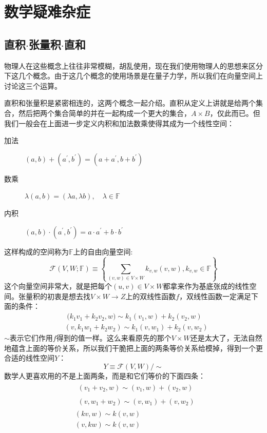 \chapter{数学疑难杂症}
\section{直积$\cdot$张量积$\cdot$直和}
物理人在这些概念上往往非常模糊，胡乱使用，现在我们使用物理人的思想来区分下这几个概念。由于这几个概念的使用场景是在量子力学，所以我们在向量空间上讨论这三个运算。

直积和张量积是紧密相连的，这两个概念一起介绍。直积从定义上讲就是给两个集合，然后把两个集合简单的并在一起构成一个更大的集合，$A\times B$，仅此而已。但我们一般会在上面进一步定义内积和加法数乘使得其成为一个线性空间：
\begin{description}
	\item[加法] $(a,b)+(a^\prime,b^\prime)=(a+a^\prime,b+b^\prime)$
	\item[数乘] $\lambda (a,b)=(\lambda a,\lambda b),\quad\lambda\in\mathbb{F}$
	\item[内积] $(a,b)\cdot (a^\prime,b^\prime)= a\cdot a^\prime +b\cdot b^\prime$
\end{description}
这样构成的空间称为$\mathbb{F}$上的自由向量空间:
\begin{equation}
	\mathcal{F}(V,W;\mathbb{F})\equiv \left\{\sum_{(v,w)\in V\times W}k_{v,w}(v,w),k_{v,w}\in\mathbb{F}\right\}
\end{equation}
这个向量空间非常大，就是把每个$(u,v)\in V\times W$都拿来作为基底张成的线性空间。张量积的初衷是想去找$V\times W\to Z$上的双线性函数$f$，双线性函数一定满足下面的条件：
\begin{equation}
	\begin{aligned}&\text{ (}k_1v_1+k_2v_2,w)\sim k_1(v_1,w)+k_2(v_2,w)\\&(v,k_1w_1+k_2w_2)\sim k_1(v,w_1)+k_2(v,w_2)\end{aligned}
\end{equation}
$\sim$表示它们作用$f$得到的值一样。这么来看原先的那个$V\times W$还是太大了，无法自然地蕴含上面的等价关系，所以我们干脆把上面的两条等价关系给模掉，得到一个更合适的线性空间$Y$：
\begin{equation}
	Y\equiv \mathcal{F}(V,W)/\sim
\end{equation}
数学人更喜欢用的不是上面两条，而是和它们等价的下面四条：
\begin{equation}
	\begin{aligned}
		&\begin{aligned}(v_1+v_2,w)\sim(v_1,w)+(v_2,w)\end{aligned} \\
		&\begin{aligned}(v,w_1+w_2)\sim(v,w_1)+(v,w_2)\end{aligned} \\
		&(kv,w)\sim k(v,w) \\
		&(v,kw)\sim k(v,w)
	\end{aligned}
\end{equation}

